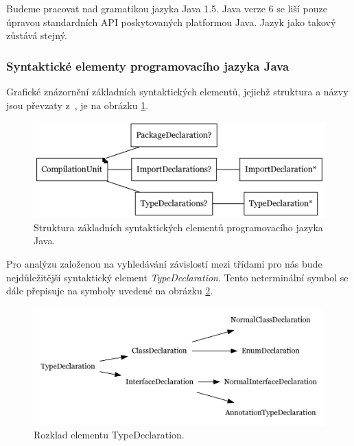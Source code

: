 Budeme pracovat nad gramatikou jazyka Java 1.5. Java verze 6 se liší pouze úpravou standardních API poskytovaných platformou Java. Jazyk jako takový zůstává stejný.

\subsubsection{Syntaktické elementy programovacího jazyka Java}
Grafické znázornění základních syntaktických elementů, jejichž struktura a názvy jsou převzaty z~\cite{Gosling:2005:JLS:1036643}, je na obrázku \ref{toplevel_elements}.
\begin{figure}[h!]
  \centering
  \includegraphics[width=\textwidth]{./graphs/java_top_elements.png}
  \caption{Struktura základních syntaktických elementů programovacího jazyka Java.\label{toplevel_elements}}
\end{figure}

Pro analýzu založenou na vyhledávání závislostí mezi třídami pro nás bude nejdůležitější syntaktický element \emph{TypeDeclaration}. Tento neterminální symbol se dále přepisuje na symboly uvedené na obrázku \ref{type_declaration_options}.

\begin{figure}[h!]
  \centering
  \includegraphics[width=\textwidth]{./graphs/toplevel_types.png}
  \caption{Rozklad elementu TypeDeclaration.\label{type_declaration_options}}
\end{figure}

